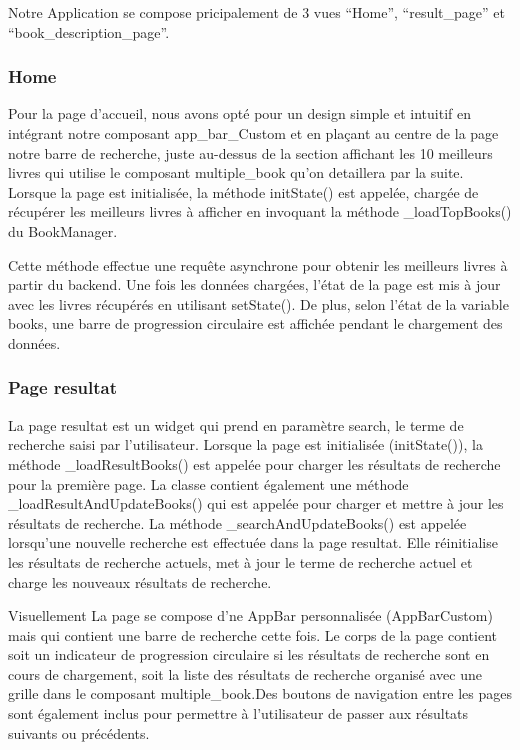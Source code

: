 Notre Application se compose pricipalement de 3 vues ``Home'',
``result\_page'' et ``book\_description\_page''.

\subsubsection{Home}\label{home}

Pour la page d'accueil, nous avons opté pour un design simple et
intuitif en intégrant notre composant app\_bar\_Custom et en plaçant au
centre de la page notre barre de recherche, juste au-dessus de la
section affichant les 10 meilleurs livres qui utilise le composant
multiple\_book qu'on detaillera par la suite. Lorsque la page est
initialisée, la méthode initState() est appelée, chargée de récupérer
les meilleurs livres à afficher en invoquant la méthode \_loadTopBooks()
du BookManager.

Cette méthode effectue une requête asynchrone pour obtenir les meilleurs
livres à partir du backend. Une fois les données chargées, l'état de la
page est mis à jour avec les livres récupérés en utilisant setState().
De plus, selon l'état de la variable books, une barre de progression
circulaire est affichée pendant le chargement des données.

\subsubsection{Page resultat}\label{page-resultat}

La page resultat est un widget qui prend en paramètre search, le terme
de recherche saisi par l'utilisateur. Lorsque la page est initialisée
(initState()), la méthode \_loadResultBooks() est appelée pour charger
les résultats de recherche pour la première page. La classe contient
également une méthode \_loadResultAndUpdateBooks() qui est appelée pour
charger et mettre à jour les résultats de recherche. La méthode
\_searchAndUpdateBooks() est appelée lorsqu'une nouvelle recherche est
effectuée dans la page resultat. Elle réinitialise les résultats de
recherche actuels, met à jour le terme de recherche actuel et charge les
nouveaux résultats de recherche.

Visuellement La page se compose d'ne AppBar personnalisée (AppBarCustom)
mais qui contient une barre de recherche cette fois. Le corps de la page
contient soit un indicateur de progression circulaire si les résultats
de recherche sont en cours de chargement, soit la liste des résultats de
recherche organisé avec une grille dans le composant multiple\_book.Des
boutons de navigation entre les pages sont également inclus pour
permettre à l'utilisateur de passer aux résultats suivants ou
précédents.

